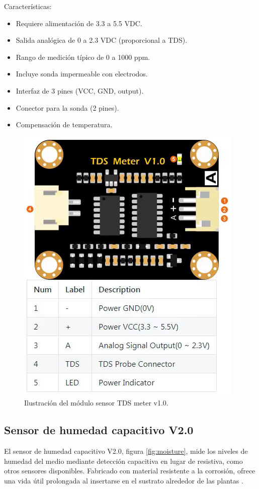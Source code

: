 Características:

\begin{itemize}
	\item Requiere alimentación de 3.3 a 5.5 VDC.
	\item Salida analógica de 0 a 2.3 VDC (proporcional a TDS).
	\item Rango de medición típico de 0 a 1000 ppm.
	\item Incluye sonda impermeable con electrodos.
	\item Interfaz de 3 pines (VCC, GND, output).
	\item Conector para la sonda (2 pines).
	\item Compensación de temperatura.
\end{itemize}


\begin{figure}[h]
\centering
\includegraphics[scale=.5]{./Figures/tds.png}
	\caption{Ilustración del módulo sensor TDS meter v1.0.}
	\label{fig:tds}
\end{figure}

\subsection{Sensor de humedad capacitivo V2.0}

El sensor de humedad capacitivo V2.0, figura \ref{fig:moisture}, mide los niveles de humedad del medio mediante detección capacitiva en lugar de resistiva, como otros sensores disponibles. Fabricado con material resistente a la corrosión, ofrece una vida útil prolongada al insertarse en el sustrato alrededor de las plantas \cite{MOISTURE}.

